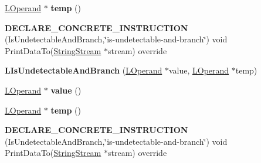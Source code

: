 \begin{DoxyCompactItemize}
\item 
\hyperlink{classv8_1_1internal_1_1_l_operand}{L\+Operand} $\ast$ {\bfseries temp} ()\hypertarget{classv8_1_1internal_1_1_l_is_undetectable_and_branch_abc3e4f5ebade89f5f49c3e6e416e9c1d}{}\label{classv8_1_1internal_1_1_l_is_undetectable_and_branch_abc3e4f5ebade89f5f49c3e6e416e9c1d}

\item 
{\bfseries D\+E\+C\+L\+A\+R\+E\+\_\+\+C\+O\+N\+C\+R\+E\+T\+E\+\_\+\+I\+N\+S\+T\+R\+U\+C\+T\+I\+ON} (Is\+Undetectable\+And\+Branch,\char`\"{}is-\/undetectable-\/and-\/branch\char`\"{}) void Print\+Data\+To(\hyperlink{classv8_1_1internal_1_1_string_stream}{String\+Stream} $\ast$stream) override\hypertarget{classv8_1_1internal_1_1_l_is_undetectable_and_branch_a28ae934f22deb295f07eed93dfd358ba}{}\label{classv8_1_1internal_1_1_l_is_undetectable_and_branch_a28ae934f22deb295f07eed93dfd358ba}

\item 
{\bfseries L\+Is\+Undetectable\+And\+Branch} (\hyperlink{classv8_1_1internal_1_1_l_operand}{L\+Operand} $\ast$value, \hyperlink{classv8_1_1internal_1_1_l_operand}{L\+Operand} $\ast$temp)\hypertarget{classv8_1_1internal_1_1_l_is_undetectable_and_branch_a48333769d21d80135872b3e667e8c882}{}\label{classv8_1_1internal_1_1_l_is_undetectable_and_branch_a48333769d21d80135872b3e667e8c882}

\item 
\hyperlink{classv8_1_1internal_1_1_l_operand}{L\+Operand} $\ast$ {\bfseries value} ()\hypertarget{classv8_1_1internal_1_1_l_is_undetectable_and_branch_aea79e90e070e85f96e2dca54b3b26773}{}\label{classv8_1_1internal_1_1_l_is_undetectable_and_branch_aea79e90e070e85f96e2dca54b3b26773}

\item 
\hyperlink{classv8_1_1internal_1_1_l_operand}{L\+Operand} $\ast$ {\bfseries temp} ()\hypertarget{classv8_1_1internal_1_1_l_is_undetectable_and_branch_abc3e4f5ebade89f5f49c3e6e416e9c1d}{}\label{classv8_1_1internal_1_1_l_is_undetectable_and_branch_abc3e4f5ebade89f5f49c3e6e416e9c1d}

\item 
{\bfseries D\+E\+C\+L\+A\+R\+E\+\_\+\+C\+O\+N\+C\+R\+E\+T\+E\+\_\+\+I\+N\+S\+T\+R\+U\+C\+T\+I\+ON} (Is\+Undetectable\+And\+Branch,\char`\"{}is-\/undetectable-\/and-\/branch\char`\"{}) void Print\+Data\+To(\hyperlink{classv8_1_1internal_1_1_string_stream}{String\+Stream} $\ast$stream) override\hypertarget{classv8_1_1internal_1_1_l_is_undetectable_and_branch_a28ae934f22deb295f07eed93dfd358ba}{}\label{classv8_1_1internal_1_1_l_is_undetectable_and_branch_a28ae934f22deb295f07eed93dfd358ba}


\end{DoxyCompactItemize}
